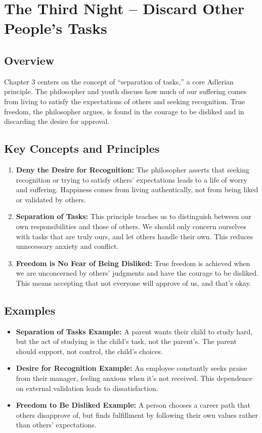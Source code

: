 \section{The Third Night – Discard Other People's Tasks}

\subsection*{Overview}
Chapter 3 centers on the concept of “separation of tasks,” a core Adlerian principle. The philosopher and youth discuss how much of our suffering comes from living to satisfy the expectations of others and seeking recognition. True freedom, the philosopher argues, is found in the courage to be disliked and in discarding the desire for approval.

\subsection*{Key Concepts and Principles}
\begin{enumerate}
    \item \textbf{Deny the Desire for Recognition:} The philosopher asserts that seeking recognition or trying to satisfy others’ expectations leads to a life of worry and suffering. Happiness comes from living authentically, not from being liked or validated by others.
    \item \textbf{Separation of Tasks:} This principle teaches us to distinguish between our own responsibilities and those of others. We should only concern ourselves with tasks that are truly ours, and let others handle their own. This reduces unnecessary anxiety and conflict.
    \item \textbf{Freedom is No Fear of Being Disliked:} True freedom is achieved when we are unconcerned by others’ judgments and have the courage to be disliked. This means accepting that not everyone will approve of us, and that’s okay.
\end{enumerate}

\subsection*{Examples}
\begin{itemize}
    \item \textbf{Separation of Tasks Example:} A parent wants their child to study hard, but the act of studying is the child’s task, not the parent’s. The parent should support, not control, the child’s choices.
    \item \textbf{Desire for Recognition Example:} An employee constantly seeks praise from their manager, feeling anxious when it’s not received. This dependence on external validation leads to dissatisfaction.
    \item \textbf{Freedom to Be Disliked Example:} A person chooses a career path that others disapprove of, but finds fulfillment by following their own values rather than others’ expectations.
\end{itemize}

